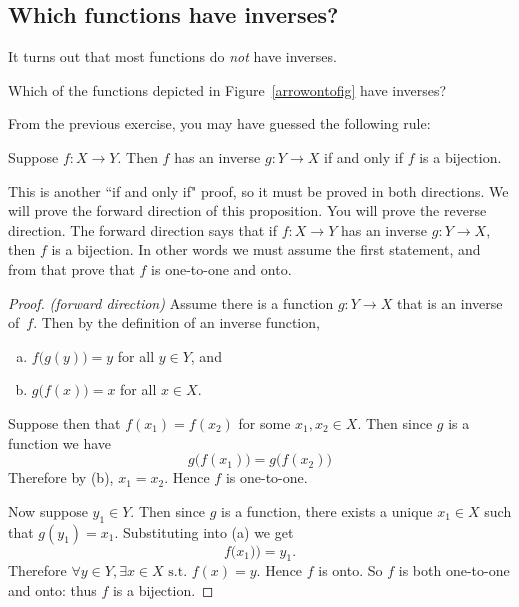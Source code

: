 \subsection{Which functions have inverses?}

It turns out that most functions do \emph{not} have inverses.  

\begin{exercise}{92}
Which of the functions depicted  in Figure~\ref{arrowontofig} have inverses?
 \end{exercise}

From the previous exercise, you may have guessed the following rule:

 \begin{thm} \label{InverseBijection}
 Suppose $f\colon X \to Y$. Then $f$ has an inverse $g \colon Y \to X$ if and only if $f$ is a bijection.
 \end{thm}
 
 This is another ``if and only if" proof, so it must be proved in both directions. We will prove the forward direction of this proposition.  You will prove the reverse direction.  The forward direction says that if $f \colon X \to Y$ has an inverse $g \colon Y \to X$, then $f$ is a bijection.  In other words we must assume the first statement, and from that prove that $f$ is one-to-one and onto.

 
 \begin{proof} \emph{(forward direction)}
 Assume there is a function $g \colon Y \to X$ that is an inverse of~$f$. Then by the definition of an inverse function,
\begin{enumerate}[(a)]
\item $f \bigl( g(y) \bigr) = y$ for all $y \in Y$, and
\item $g \bigl( f(x) \bigr) = x$ for all $x \in X$.
\end{enumerate}
Suppose then that $f(x_1) = f(x_2)$ for some $x_1, x_2 \in X$.  Then since $g$ is a function we have
$$g \bigl( f(x_1) \bigr) = g \bigl( f(x_2) \bigr)$$
Therefore by (b), $x_1 = x_2$. Hence $f$ is one-to-one.

\noindent
Now suppose $y_1 \in Y$.  Then since $g$ is a function, there exists a unique  $x_1 \in X$ such that $g(y_1) = x_1$.  Substituting into (a) we get
\[f \bigl(x_1) \bigr) = y_1.\]
Therefore $\forall y \in Y, \exists x \in X \mbox{ s.t. } f(x) = y$.  Hence $f$ is onto.
So $f$ is both one-to-one and onto: thus $f$ is a bijection.
 \end{proof}

